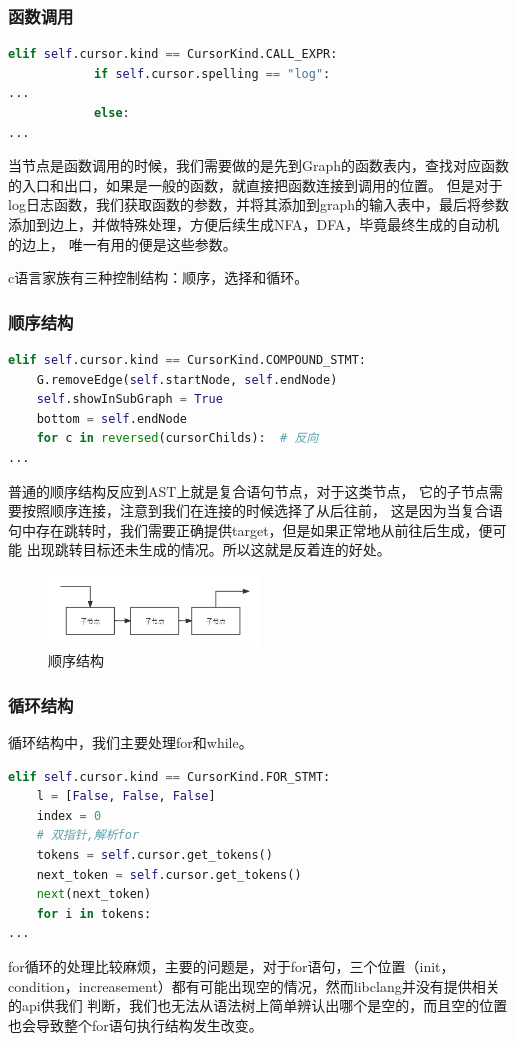 \subsubsection{函数调用}
{\small
\begin{lstlisting}[language=Python]
 elif self.cursor.kind == CursorKind.CALL_EXPR:
            if self.cursor.spelling == "log":
...
            else:
...
\end{lstlisting}
}
当节点是函数调用的时候，我们需要做的是先到Graph的函数表内，查找对应函数的入口和出口，如果是一般的函数，就直接把函数连接到调用的位置。
但是对于log日志函数，我们获取函数的参数，并将其添加到graph的输入表中，最后将参数添加到边上，并做特殊处理，方便后续生成NFA，DFA，毕竟最终生成的自动机的边上，
唯一有用的便是这些参数。

c语言家族有三种控制结构：顺序，选择和循环。
\subsubsection{顺序结构}
{\small
\begin{lstlisting}[language=Python]
elif self.cursor.kind == CursorKind.COMPOUND_STMT:
    G.removeEdge(self.startNode, self.endNode)
    self.showInSubGraph = True
    bottom = self.endNode
    for c in reversed(cursorChilds):  # 反向
...
\end{lstlisting}
}
普通的顺序结构反应到AST上就是复合语句节点，对于这类节点，
它的子节点需要按照顺序连接，注意到我们在连接的时候选择了从后往前，
这是因为当复合语句中存在跳转时，我们需要正确提供target，但是如果正常地从前往后生成，便可能
出现跳转目标还未生成的情况。所以这就是反着连的好处。
\begin{figure}[htbp]
	\centering
	\includegraphics[width=0.5\textwidth]{pictures/顺序结构.png}
	\caption{顺序结构}
	\label{fig:顺序结构}
\end{figure}

\subsubsection{循环结构}
循环结构中，我们主要处理for和while。
{\small
\begin{lstlisting}[language=Python]
elif self.cursor.kind == CursorKind.FOR_STMT:
    l = [False, False, False]
    index = 0
    # 双指针,解析for
    tokens = self.cursor.get_tokens()
    next_token = self.cursor.get_tokens()
    next(next_token)
    for i in tokens:
...
\end{lstlisting}
}
for循环的处理比较麻烦，主要的问题是，对于for语句，三个位置（init，condition，increasement）都有可能出现空的情况，然而libclang并没有提供相关的api供我们
判断，我们也无法从语法树上简单辨认出哪个是空的，而且空的位置也会导致整个for语句执行结构发生改变。

